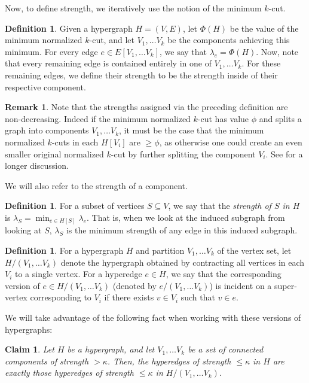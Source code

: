 \documentclass[11pt]{article}
\newtheorem{claim}[theorem]{Claim}
\theoremstyle{definition}
\newtheorem{definition}[theorem]{Definition}
\newtheorem{remark}[theorem]{Remark}
\begin{document}
Now, to define strength, we iteratively use the notion of the minimum $k$-cut.
\begin{definition}
	Given a hypergraph $H = (V, E)$, let $\Phi(H)$ be the value of the minimum normalized $k$-cut, and let $V_1, \dots V_k$ be the components achieving this minimum. For every edge $e \in E[V_1, \dots V_k]$, we say that $\lambda_e = \Phi(H)$. Now, note that every remaining edge is contained entirely in one of $V_1, \dots V_k$. For these remaining edges, we define their strength to be the strength inside of their respective component.
\end{definition}

\begin{remark}\label{rmk:monotone}
	Note that the strengths assigned via the preceding definition are non-decreasing. Indeed if the minimum normalized $k$-cut has value $\phi$ and splits a graph into components $V_1, \dots V_k$, it must be the case that the minimum normalized $k$-cuts in each $H[V_i]$ are $\geq \phi$, as otherwise one could create an even smaller original normalized $k$-cut by further splitting the component $V_i$. See \cite{Qua23, KPS24d} for a longer discussion. 
\end{remark}

We will also refer to the strength of a component.

\begin{definition}
	For a subset of vertices $ S \subseteq V$, we say that the \emph{strength of $S$ in $H$} is $\lambda_S = \min_{e \in H[S]} \lambda_e$. That is, when we look at the induced subgraph from looking at $S$, $\lambda_S$ is the minimum strength of any edge in this induced subgraph. 
\end{definition}

\begin{definition}\label{def:contractedHypergraph}
	For a hypergraph $H$ and partition $V_1, \dots V_k$ of the vertex set, let $H / (V_1, \dots V_k)$ denote the hypergraph obtained by contracting all vertices in each $V_i$ to a single vertex. For a hyperedge $e \in H$, we say that the corresponding version of $e \in H / (V_1, \dots V_k)$ (denoted by $e / (V_1, \dots V_k)$) is incident on a super-vertex corresponding to $V_i$ if there exists $v \in V_i$ such that $v \in e$.
\end{definition}

We will take advantage of the following fact when working with these  versions of hypergraphs:

\begin{claim}
	Let $H$ be a hypergraph, and let $V_1, \dots V_k$ be a set of connected components of strength $> \kappa$. Then, the hyperedges of strength $\leq \kappa$ in $H$ are exactly those hyperedges of strength $\leq \kappa$ in $H/(V_1, \dots V_k)$.
\end{claim}
\end{document}

